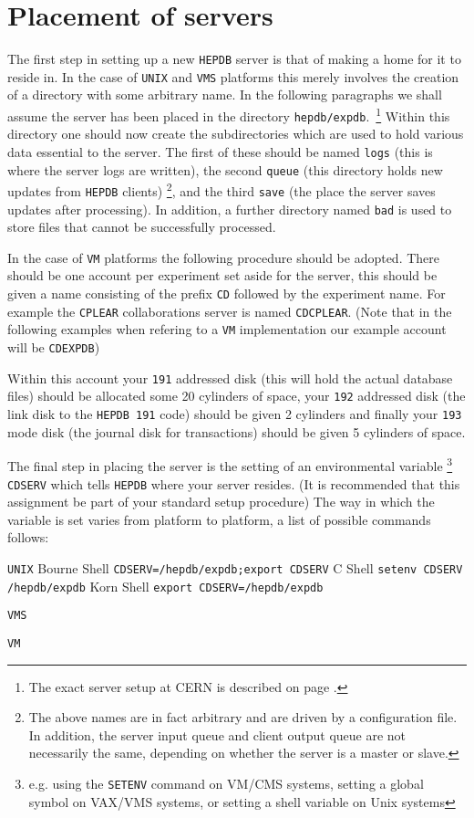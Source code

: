 \section{Placement of servers}
The first step in setting up a new {\tt HEPDB} server is that of making a home for
it to reside in. In the case of {\tt UNIX} and {\tt VMS} platforms this merely
involves the creation of a directory with some arbitrary name. In the following
paragraphs we shall assume the server has been placed in the directory
{\tt hepdb/expdb}.~\footnote{The exact server setup at CERN is described on page \pageref{CERN-servers}.}
Within this directory one should now create the subdirectories
which are used to hold various data essential to the server. The first of
these should be named {\tt logs} (this is where the server logs are written), the
second {\tt queue} (this directory holds new updates from {\tt HEPDB} clients)
\footnote{The above names are in fact arbitrary and are driven by a configuration
file. In addition, the server input queue and client output queue are not necessarily
the same, depending on whether the server is a master or slave.}, and
the third {\tt save} (the place the server saves updates after processing).
In addition, a further directory named {\tt bad} is used to store files that
cannot be successfully processed.
\par
In the case of {\tt VM} platforms the following procedure should be adopted. There
should be one account per experiment set aside for the server, this should be given
a name consisting of the prefix {\tt CD} followed by the experiment name. For example
the {\tt CPLEAR} collaborations server is named {\tt CDCPLEAR}.
(Note that in the following examples when refering to a {\tt VM} implementation
our example account will be {\tt CDEXPDB})
\par
Within this account your {\tt 191} addressed disk (this will hold the actual
database files) should be allocated some 20 cylinders of space, your {\tt 192} addressed disk
(the link disk to the {\tt HEPDB 191} code) should be given 2 cylinders and finally
your {\tt 193} mode disk (the journal disk for transactions) should be given 5 cylinders of space.
\par
The final step in placing the server is the setting of an environmental
variable \footnote{e.g. using the {\tt SETENV} command on VM/CMS systems,
setting a global symbol on VAX/VMS systems, or setting a shell variable
on Unix systems}
 {\tt CDSERV}  which tells {\tt HEPDB} where your server resides.
(It is recommended that this assignment be part of your standard setup procedure)
The way in which the variable is set varies from platform to platform, a
list of possible commands follows:
\par
\begin{UL}
\item {\tt UNIX}
\subitem Bourne Shell {\tt CDSERV=/hepdb/expdb;export CDSERV}
\subitem C Shell {\tt setenv CDSERV /hepdb/expdb}
\subitem Korn Shell {\tt export CDSERV=/hepdb/expdb}
\item {\tt VMS}
\item {\tt VM}
\end{UL}
